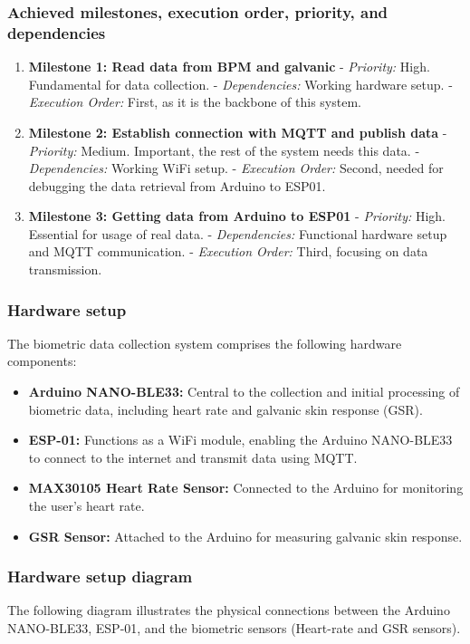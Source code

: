 \documentclass{article}
\begin{document}
\subsubsection{Achieved milestones, execution order, priority, and dependencies}
\begin{enumerate}
    \item \textbf{Milestone 1: Read data from BPM and galvanic}
       - \textit{Priority:} High. Fundamental for data collection.
       - \textit{Dependencies:} Working hardware setup.
       - \textit{Execution Order:} First, as it is the backbone of this system.

    \item \textbf{Milestone 2: Establish connection with MQTT and publish data}
       - \textit{Priority:} Medium. Important, the rest of the system needs this data.
       - \textit{Dependencies:} Working WiFi setup.
       - \textit{Execution Order:} Second, needed for debugging the data retrieval from Arduino to ESP01.

    \item \textbf{Milestone 3: Getting data from Arduino to ESP01}
       - \textit{Priority:} High. Essential for usage of real data.
       - \textit{Dependencies:} Functional hardware setup and MQTT communication.
       - \textit{Execution Order:} Third, focusing on data transmission.
\end{enumerate}

\subsubsection{Hardware setup}
The biometric data collection system comprises the following hardware components:
\begin{itemize}
    \item \textbf{Arduino NANO-BLE33:} Central to the collection and initial processing of biometric data, including heart rate and galvanic skin response (GSR).
    \item \textbf{ESP-01:} Functions as a WiFi module, enabling the Arduino NANO-BLE33 to connect to the internet and transmit data using MQTT.
    \item \textbf{MAX30105 Heart Rate Sensor:} Connected to the Arduino for monitoring the user's heart rate.
    \item \textbf{GSR Sensor:} Attached to the Arduino for measuring galvanic skin response.
\end{itemize}

\subsubsection{Hardware setup diagram}
The following diagram illustrates the physical connections between the Arduino NANO-BLE33, ESP-01, and the biometric sensors (Heart-rate and GSR sensors).
\end{document}
